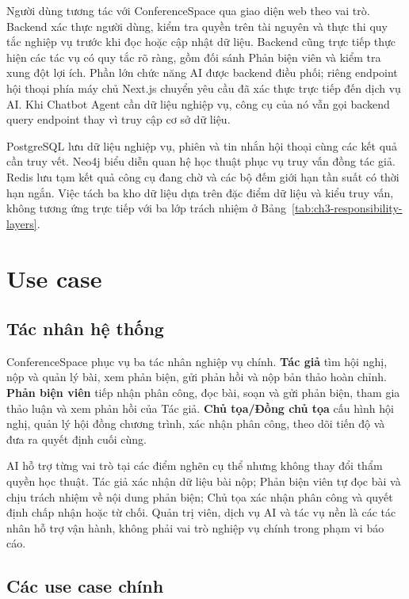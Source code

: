 Người dùng tương tác với ConferenceSpace qua giao diện web theo vai trò. Backend xác thực người dùng, kiểm tra quyền trên tài nguyên và thực thi quy tắc nghiệp vụ trước khi đọc hoặc cập nhật dữ liệu. Backend cũng trực tiếp thực hiện các tác vụ có quy tắc rõ ràng, gồm đối sánh Phản biện viên và kiểm tra xung đột lợi ích. Phần lớn chức năng AI được backend điều phối; riêng endpoint hội thoại phía máy chủ Next.js chuyển yêu cầu đã xác thực trực tiếp đến dịch vụ AI. Khi Chatbot Agent cần dữ liệu nghiệp vụ, công cụ của nó vẫn gọi backend query endpoint thay vì truy cập cơ sở dữ liệu.

PostgreSQL lưu dữ liệu nghiệp vụ, phiên và tin nhắn hội thoại cùng các kết quả cần truy vết. Neo4j biểu diễn quan hệ học thuật phục vụ truy vấn đồng tác giả. Redis lưu tạm kết quả công cụ đang chờ và các bộ đếm giới hạn tần suất có thời hạn ngắn. Việc tách ba kho dữ liệu dựa trên đặc điểm dữ liệu và kiểu truy vấn, không tương ứng trực tiếp với ba lớp trách nhiệm ở Bảng~\ref{tab:ch3-responsibility-layers}.

\section{Use case}
\label{sec:ch3-usecases-cut}

\subsection{Tác nhân hệ thống}

ConferenceSpace phục vụ ba tác nhân nghiệp vụ chính. \textbf{Tác giả} tìm hội nghị, nộp và quản lý bài, xem phản biện, gửi phản hồi và nộp bản thảo hoàn chỉnh. \textbf{Phản biện viên} tiếp nhận phân công, đọc bài, soạn và gửi phản biện, tham gia thảo luận và xem phản hồi của Tác giả. \textbf{Chủ tọa/Đồng chủ tọa} cấu hình hội nghị, quản lý hội đồng chương trình, xác nhận phân công, theo dõi tiến độ và đưa ra quyết định cuối cùng.

AI hỗ trợ từng vai trò tại các điểm nghẽn cụ thể nhưng không thay đổi thẩm quyền học thuật. Tác giả xác nhận dữ liệu bài nộp; Phản biện viên tự đọc bài và chịu trách nhiệm về nội dung phản biện; Chủ tọa xác nhận phân công và quyết định chấp nhận hoặc từ chối. Quản trị viên, dịch vụ AI và tác vụ nền là các tác nhân hỗ trợ vận hành, không phải vai trò nghiệp vụ chính trong phạm vi báo cáo.

\subsection{Các use case chính}
\label{subsec:ch3-usecase-overview-cut}

